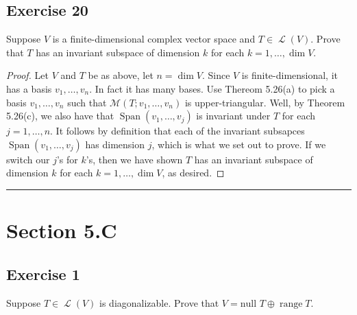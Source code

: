 \documentclass[letterpaper, 12pt]{amsart}
\DeclareMathOperator{\Ell}{\mathscr{L}}				%
\renewcommand{\null}{\text{null }}					%
\DeclareMathOperator{\range}{\text{range }}			%
\DeclareMathOperator{\Span}{Span}					%
\theoremstyle{definition}  							%
\begin{document}
		\subsection*{Exercise 20}
		Suppose $V$ is a finite-dimensional complex vector space and $T \in \Ell(V)$. 
		Prove that $T$ has an invariant subspace of dimension $k$ for each $k = 1, \dots, \dim{V}$.
		\vspace*{3mm}

		\begin{proof}
		Let $V$ and $T$ be as above, let $n = \dim V$.
		Since $V$ is finite-dimensional, it has a basis $v_{1}, \dots, v_{n}$.
		In fact it has many bases.
		Use Thereom 5.26(a) to pick a basis $v_{1}, \dots, v_{n}$ such that $\mathcal{M}(T; v_{1}, \dots, v_{n})$ is upper-triangular.
		Well, by Theorem 5.26(c), we also have that $\Span(v_{1}, \dots, v_{j})$ is invariant under $T$ for each $j = 1, \dots, n$.
		It follows by definition that each of the invariant subsapces $\Span(v_{1}, \dots, v_{j})$ has dimension $j$, which is what we set out to prove.
		If we switch our $j$'s for $k$'s, then we have shown $T$ has an invariant subspace of dimension $k$ for each $k = 1, \dots, \dim{V}$, as desired.
		\end{proof}
		\vspace*{2mm}
		\hrule
		\vspace*{2mm}

	\section*{Section 5.C}
		\subsection*{Exercise 1}
		Suppose $T \in \Ell(V)$ is diagonalizable. 
		Prove that $V = \null T \oplus \range T$.
		\vspace*{3mm}
\end{document}
